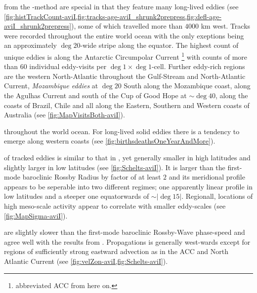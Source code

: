 \newcommand{\run}[1]{#1-aviI}
\newcommand{\RUN}{\aviI:\;}
 from the \MI -method are special in that they feature many long-lived eddies (see \cref{fig:histTrackCount-aviI,fig:tracks-age-aviI_shrunk2prepress,fig:defl-age-aviI_shrunk2prepress}),
some of which travelled more than $4000$ km west.
Tracks were recorded throughout the entire world ocean with the only exeptions being an approximately $\deg{20}$-wide stripe along the equator. The highest count of unique eddies is along the Antarctic Circumpolar Current \footnote{abbreviated ACC from here on.} with counts of more than $60$ individual eddy-visits per $\deg{1} \times \deg{1}$-cell. Further eddy-rich regions are the western North-Atlantic throughout the Gulf-Stream and North-Atlantic Current, \textit{Mozambique eddies} \citep{schouten2003eddies} at $\deg{20}$ South along the Mozambique coast, along the Agulhas Current and south of the Cup of Good Hope at $\sim \deg{40}$, along the coasts of Brazil, Chile and all along the Eastern, Southern and Western coasts of Australia (see \cref{fig:MapVisitsBoth-aviI}).

  throughout the world ocean. For long-lived solid eddies there is a tendency to emerge along western coasts (see \cref{fig:birthsdeathsOneYearAndMore}).

 \scale of tracked eddies is similar to that in \citet{them}, yet generally smaller in high latitudes and slightly larger in low latitudes (see \cref{fig:Schelts-aviI}). It is larger than the first-mode baroclinic Rossby Radius by factor of at least $2$ and its meridional profile appears to be seperable into two different regimes; one apparently linear profile in low latitudes and a steeper one equatorwards of $\sim \left| \deg{15} \right|$. Regionall, locations of high meso-scale activity appear to correlate with smaller eddy-scales (see \cref{fig:MapSigma-aviI}).

 are slightly slower than the first-mode baroclinic Rossby-Wave phase-speed and agree well with the results from \citet{them}. Propagations is generally west-wards except for regions of sufficiently strong eastward advection as in the ACC and North Atlantic Current (see \cref{fig:velZon-aviI,fig:Schelts-aviI}).

